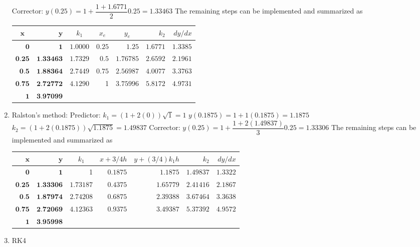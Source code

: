 \documentclass[../main.tex]{subfiles}
\begin{document}
\begin{enumerate}[label=\bfseries(\alph*)]
	\bigbreak
Corrector:
	\bigbreak
$y(0.25)=1+\dfrac{1+1.6771}{2} 0.25=1.33463$
	\bigbreak
The remaining steps can be implemented and summarized as
	\bigbreak
\begin{tabular}{rrcrrrr}
\hline
\multicolumn{1}{c}{$\boldsymbol{x}$} & $\boldsymbol{y}$ & $k_{1}$ & \multicolumn{1}{c}{$x_{e}$} & \multicolumn{1}{c}{$y_{e}$} & $k_{2}$ & $d y / d x$ \\
\hline
$\mathbf{0}$ & $\mathbf{1}$ & $1.0000$ & $0.25$ & $1.25$ & $1.6771$ & $1.3385$ \\
$\mathbf{0 . 2 5}$ & $\mathbf{1 . 3 3 4 6 3}$ & $1.7329$ & $0.5$ & $1.76785$ & $2.6592$ & $2.1961$ \\
$\mathbf{0 . 5}$ & $\mathbf{1 . 8 8 3 6 4}$ & $2.7449$ & $0.75$ & $2.56987$ & $4.0077$ & $3.3763$ \\
$\mathbf{0 . 7 5}$ & $\mathbf{2 . 7 2 7 7 2}$ & $4.1290$ & 1 & $3.75996$ & $5.8172$ & $4.9731$ \\
$\mathbf{1}$ & $\mathbf{3 . 9 7 0 9 9}$ &  &  &  &  &  \\
\hline
\end{tabular}
	\bigbreak
\item Ralston's method:
	\bigbreak
Predictor:
	\bigbreak
$k_{1}=(1+2(0)) \sqrt{1}=1$
	\bigbreak
$y(0.1875)=1+1(0.1875)=1.1875$
	\bigbreak
$k_{2}=(1+2(0.1875)) \sqrt{1.1875}=1.49837$
	\bigbreak
Corrector:
	\bigbreak
$y(0.25)=1+\dfrac{1+2(1.49837)}{3} 0.25=1.33306$
	\bigbreak
The remaining steps can be implemented and summarized as
	\bigbreak
\begin{tabular}{rrrrrrr}
\hline
\multicolumn{1}{r}{$\boldsymbol{x}$} & $\boldsymbol{y}$ & \multicolumn{1}{c}{$k_{1}$} & $x+3 / 4 h$ & $y+(3 / 4) k_{1} h$ & $k_{2}$ & $d y / d x$ \\
\hline
$\mathbf{0}$ & $\mathbf{1}$ & 1 & $0.1875$ & $1.1875$ & $1.49837$ & $1.3322$ \\
$\mathbf{0 . 2 5}$ & $\mathbf{1 . 3 3 3 0 6}$ & $1.73187$ & $0.4375$ & $1.65779$ & $2.41416$ & $2.1867$ \\
$\mathbf{0 . 5}$ & $\mathbf{1 . 8 7 9 7 4}$ & $2.74208$ & $0.6875$ & $2.39388$ & $3.67464$ & $3.3638$ \\
$\mathbf{0 . 7 5}$ & $\mathbf{2 . 7 2 0 6 9}$ & $4.12363$ & $0.9375$ & $3.49387$ & $5.37392$ & $4.9572$ \\
$\mathbf{1}$ & $\mathbf{3 . 9 5 9 9 8}$ &  &  &  &  &  \\
\hline
\end{tabular}
	\bigbreak
\item RK4
	\bigbreak
\begin{tabular}{ccccccccccccc}

\end{tabular}
\end{enumerate}
\end{document}
